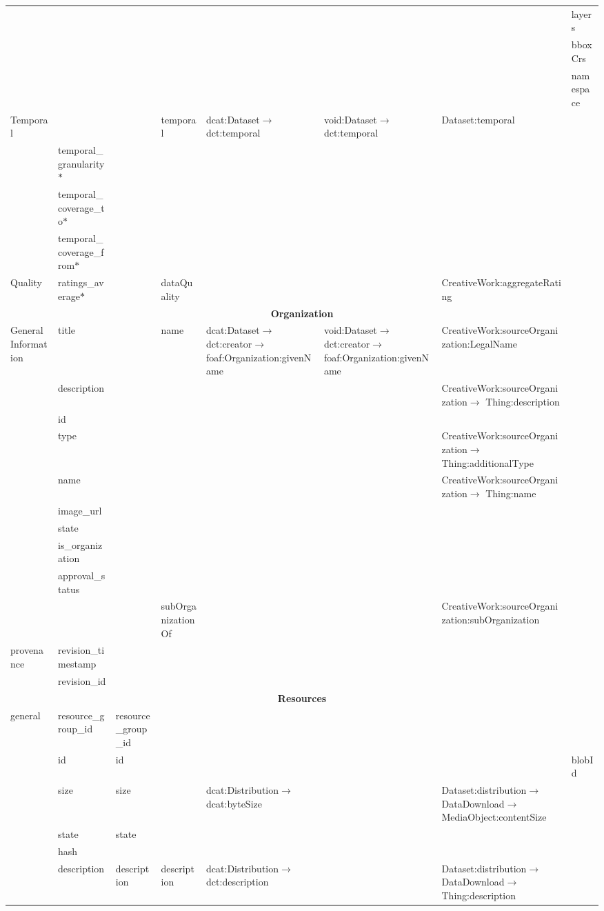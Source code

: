 \documentclass[runningheads,a4paper]{../../Tools/LaTEX/llncs}
\begin{document}
{\begin{landscape}
{\begin{longtable}{|p{1cm}|m{3.1cm}|m{2.4cm}|m{2.5cm}|p{3.8cm}|m{3.8cm}|m{6.5cm}|m{2.5cm}|}
\cline{2-8}
 &  &  &  &  &  &  & layers\tabularnewline
\cline{2-8}
 &  &  &  &  &  &  & bboxCrs\tabularnewline
\cline{2-8}
 &  &  &  &  &  &  & namespace\tabularnewline
\hline
\multirow{4}{2cm}{Temporal} &  &  & temporal & dcat:Dataset$\rightarrow$ dct:temporal & void:Dataset$\rightarrow$ dct:temporal & Dataset:temporal & \tabularnewline
\cline{2-8}
 & temporal\_granularity$\ast$ &  &  &  &  &  & \tabularnewline
\cline{2-8}
 & temporal\_coverage\_to$\ast$ &  &  &  &  &  & \tabularnewline
\cline{2-8}
 & temporal\_coverage\_from$\ast$ &  &  &  &  &  & \tabularnewline
\hline
Quality & ratings\_average$\ast$ &  & dataQuality &  &  & CreativeWork:aggregateRating & \tabularnewline
\hline
\multicolumn{8}{|c|}{\cellcolor{blue!25}\textbf{Organization}}\tabularnewline
\hline
\multirow{10}{2cm}{General Information} & title &  & name & dcat:Dataset$\rightarrow$ dct:creator$\rightarrow$ foaf:Organization:givenName & void:Dataset$\rightarrow$ dct:creator$\rightarrow$ foaf:Organization:givenName & CreativeWork:sourceOrganization:LegalName & \tabularnewline
\cline{2-8}
 & description &  &  &  &  & CreativeWork:sourceOrganization$\rightarrow$ Thing:description & \tabularnewline
\cline{2-8}
 & id &  &  &  &  &  & \tabularnewline
\cline{2-8}
 & type &  &  &  &  & CreativeWork:sourceOrganization$\rightarrow$ Thing:additionalType & \tabularnewline
\cline{2-8}
 & name &  &  &  &  & CreativeWork:sourceOrganization$\rightarrow$ Thing:name & \tabularnewline
\cline{2-8}
 & image\_url &  &  &  &  &  & \tabularnewline
\cline{2-8}
 & state &  &  &  &  &  & \tabularnewline
\cline{2-8}
 & is\_organization &  &  &  &  &  & \tabularnewline
\cline{2-8}
 & approval\_status &  &  &  &  &  & \tabularnewline
\cline{2-8}
 &  &  & subOrganizationOf &  &  & CreativeWork:sourceOrganization:subOrganization & \tabularnewline
\multirow{2}{2cm}{provenance} & revision\_timestamp &  &  &  &  &  & \tabularnewline
\cline{2-8}
 & revision\_id &  &  &  &  &  & \tabularnewline
\hline
\multicolumn{8}{|c|}{\cellcolor{blue!25}\textbf{Resources}}\tabularnewline
\hline
\multirow{15}{2cm}{general} & resource\_group\_id & resource\_group\_id &  &  &  &  & \tabularnewline
\cline{2-8}
 & id & id &  &  &  &  & blobId\tabularnewline
\cline{2-8}
 & size & size &  & dcat:Distribution$\rightarrow$ dcat:byteSize &  & Dataset:distribution$\rightarrow$ DataDownload$\rightarrow$ MediaObject:contentSize & \tabularnewline
\cline{2-8}
 & state & state &  &  &  &  & \tabularnewline
\cline{2-8}
 & hash &  &  &  &  &  & \tabularnewline
\cline{2-8}
 & description & description & description & dcat:Distribution$\rightarrow$ dct:description &  & Dataset:distribution$\rightarrow$ DataDownload$\rightarrow$ Thing:description & \tabularnewline

\end{longtable}}
\end{landscape}}
\end{document}
